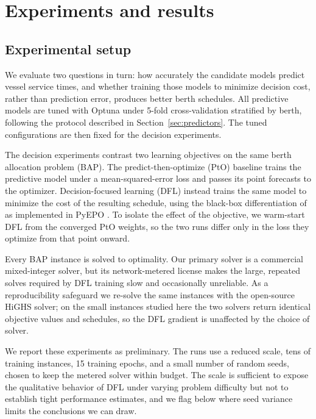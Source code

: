 \section{Experiments and results}\label{sec:results}

\subsection{Experimental setup}

We evaluate two questions in turn: how accurately the candidate models predict vessel service times, and whether training those models to minimize decision cost, rather than prediction error, produces better berth schedules. All predictive models are tuned with Optuna under 5-fold cross-validation stratified by berth, following the protocol described in Section~\ref{sec:predictors}. The tuned configurations are then fixed for the decision experiments.

The decision experiments contrast two learning objectives on the same berth allocation problem (BAP). The predict-then-optimize (PtO) baseline trains the predictive model under a mean-squared-error loss and passes its point forecasts to the optimizer. Decision-focused learning (DFL) instead trains the same model to minimize the cost of the resulting schedule, using the black-box differentiation of \citet{pogancic2020blackbox} as implemented in PyEPO \citep{tang2024pyepo}. To isolate the effect of the objective, we warm-start DFL from the converged PtO weights, so the two runs differ only in the loss they optimize from that point onward.

Every BAP instance is solved to optimality. Our primary solver is a commercial mixed-integer solver, but its network-metered license makes the large, repeated solves required by DFL training slow and occasionally unreliable. As a reproducibility safeguard we re-solve the same instances with the open-source HiGHS solver; on the small instances studied here the two solvers return identical objective values and schedules, so the DFL gradient is unaffected by the choice of solver.

We report these experiments as preliminary. The runs use a reduced scale, tens of training instances, 15 training epochs, and a small number of random seeds, chosen to keep the metered solver within budget. The scale is sufficient to expose the qualitative behavior of DFL under varying problem difficulty but not to establish tight performance estimates, and we flag below where seed variance limits the conclusions we can draw.

